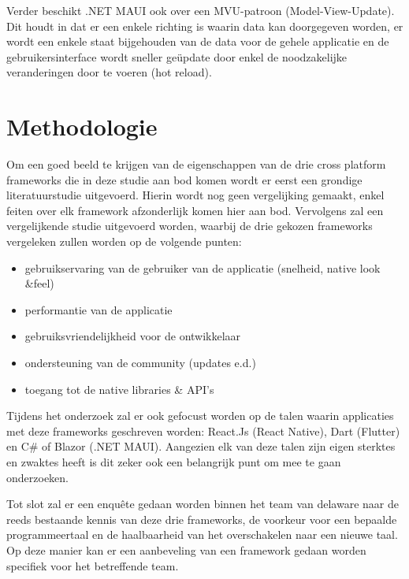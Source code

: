 Verder beschikt .NET MAUI ook over een MVU-patroon (Model-View-Update). Dit houdt in dat er een enkele richting is waarin data kan doorgegeven worden, er wordt een enkele staat bijgehouden van de data voor de gehele applicatie en de gebruikersinterface wordt sneller geüpdate door enkel de noodzakelijke veranderingen door te voeren (hot reload).


\section{Methodologie}
\label{sec:methodologie}

Om een goed beeld te krijgen van de eigenschappen van de drie cross platform frameworks die in deze studie aan bod komen wordt er eerst een grondige literatuurstudie uitgevoerd. Hierin wordt nog geen vergelijking gemaakt, enkel feiten over elk framework afzonderlijk komen hier aan bod. Vervolgens zal een vergelijkende studie uitgevoerd worden, waarbij de drie gekozen frameworks vergeleken zullen worden op de volgende punten: 

\begin{itemize}
    \item gebruikservaring van de gebruiker van de applicatie (snelheid, native look \&feel)
    \item performantie van de applicatie
    \item gebruiksvriendelijkheid voor de ontwikkelaar
    \item ondersteuning van de community (updates e.d.)
    \item toegang tot de native libraries \& API's
\end{itemize}

Tijdens het onderzoek zal er ook gefocust worden op de talen waarin applicaties met deze frameworks geschreven worden: React.Js (React Native), Dart (Flutter) en C\# of Blazor (.NET MAUI). Aangezien elk van deze talen zijn eigen sterktes en zwaktes heeft is dit zeker ook een belangrijk punt om mee te gaan onderzoeken. 

Tot slot zal er een enquête gedaan worden binnen het team van delaware naar de reeds bestaande kennis van deze drie frameworks, de voorkeur voor een bepaalde programmeertaal en de haalbaarheid van het overschakelen naar een nieuwe taal. Op deze manier kan er een aanbeveling van een framework gedaan worden specifiek voor het betreffende team.


